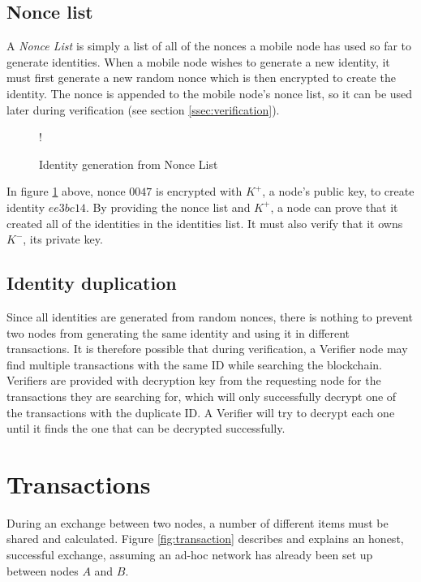 \subsection{Nonce list} \label{sssec:nonce_list}
A \textit{Nonce List} is simply a list of all of the nonces a mobile node has used so far to generate identities. When a mobile node wishes to generate a new identity, it must first generate a new random nonce which is then encrypted to create the identity. The nonce is appended to the mobile node's nonce list, so it can be used later during verification (see section \ref{ssec:verification}).

\begin{figure}[H]
\resizebox {\columnwidth} {!} {}
\caption{Identity generation from Nonce List}
\label{fig:nonce_list}
\end{figure}

In figure \ref{fig:nonce_list} above, nonce $0047$ is encrypted with $K^+$, a node's public key, to create identity $ee3bc14$. By providing the nonce list and $K^+$, a node can prove that it created all of the identities in the identities list. It must also verify that it owns $K^-$, its private key.

\subsection{Identity duplication}
Since all identities are generated from random nonces, there is nothing to prevent two nodes from generating the same identity and using it in different transactions. It is therefore possible that during verification, a Verifier node may find multiple transactions with the same ID while searching the blockchain. Verifiers are provided with decryption key from the requesting node for the transactions they are searching for, which will only successfully decrypt one of the transactions with the duplicate ID. A Verifier will try to decrypt each one until it finds the one that can be decrypted successfully.

\newpage
\section{Transactions} \label{sec:transactions}
During an exchange between two nodes, a number of different items must be shared and calculated. Figure \ref{fig:transaction} describes and explains an honest, successful exchange, assuming an ad-hoc network has already been set up between nodes $A$ and $B$.

